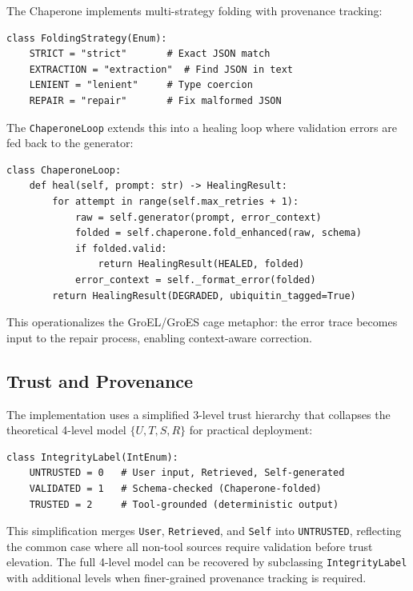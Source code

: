The Chaperone implements multi-strategy folding with provenance tracking:

\begin{verbatim}
class FoldingStrategy(Enum):
    STRICT = "strict"       # Exact JSON match
    EXTRACTION = "extraction"  # Find JSON in text
    LENIENT = "lenient"     # Type coercion
    REPAIR = "repair"       # Fix malformed JSON
\end{verbatim}

The \texttt{ChaperoneLoop} extends this into a healing loop where validation errors are fed back
to the generator:

\begin{verbatim}
class ChaperoneLoop:
    def heal(self, prompt: str) -> HealingResult:
        for attempt in range(self.max_retries + 1):
            raw = self.generator(prompt, error_context)
            folded = self.chaperone.fold_enhanced(raw, schema)
            if folded.valid:
                return HealingResult(HEALED, folded)
            error_context = self._format_error(folded)
        return HealingResult(DEGRADED, ubiquitin_tagged=True)
\end{verbatim}

This operationalizes the GroEL/GroES cage metaphor: the error trace becomes input to the
repair process, enabling context-aware correction.

\subsection{Trust and Provenance}

The implementation uses a simplified 3-level trust hierarchy that collapses the theoretical 4-level
model $\{U, T, S, R\}$ for practical deployment:

\begin{verbatim}
class IntegrityLabel(IntEnum):
    UNTRUSTED = 0   # User input, Retrieved, Self-generated
    VALIDATED = 1   # Schema-checked (Chaperone-folded)
    TRUSTED = 2     # Tool-grounded (deterministic output)
\end{verbatim}

This simplification merges \texttt{User}, \texttt{Retrieved}, and \texttt{Self} into \texttt{UNTRUSTED},
reflecting the common case where all non-tool sources require validation before trust elevation. The
full 4-level model can be recovered by subclassing \texttt{IntegrityLabel} with additional levels when
finer-grained provenance tracking is required.

